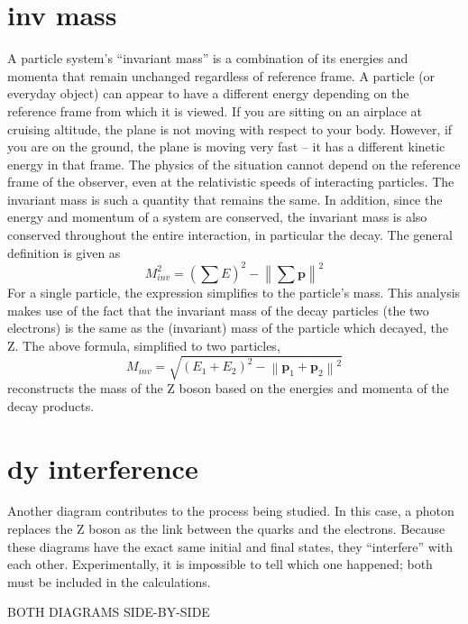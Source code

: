 \section{inv mass}
A particle system's ``invariant mass'' is 
a combination of its energies and momenta that 
remain unchanged regardless of reference frame.  
A particle (or everyday object) can appear to 
have a different energy depending on the reference 
frame from which it is viewed.  
If you are sitting on an airplace at cruising altitude, 
the plane is not moving with respect to your body.  
However, if you are on the ground, the plane is 
moving very fast -- 
it has a different kinetic energy in that frame.  
The physics of the situation cannot depend on 
the reference frame of the observer, 
even at the relativistic speeds of interacting particles.  
The invariant mass is such a quantity that 
remains the same.  
In addition, since the energy and momentum 
of a system are conserved, 
the invariant mass is also conserved 
throughout the entire interaction, 
in particular the decay.  
The general definition is given as 
\[
M_{inv}^2 = \left( \sum E \right)^2 - \left\| \sum \mathbf{p} \right\|^2
\]
For a single particle, the expression simplifies 
to the particle's mass.  
This analysis makes use of the fact that the 
invariant mass of the decay particles 
(the two electrons) 
is the same as the (invariant) mass of the 
particle which decayed, the Z.  
The above formula, simplified to two particles, 
\[
M_{inv} = \sqrt{ \left(E_1 + E_2\right)^2 - \left\|\mathbf{p}_1 + \mathbf{p}_2\right\|^2 }
\]
reconstructs the mass of the Z boson 
based on the energies and momenta 
of the decay products.  


\section{dy interference}
Another diagram contributes to the process being studied. 
In this case, a photon replaces the Z boson 
as the link between the quarks and the electrons.  
Because these diagrams have the exact same 
initial and final states, 
they ``interfere'' with each other.  
Experimentally, it is impossible to tell which one happened; 
both must be included in the calculations.  %

BOTH DIAGRAMS SIDE-BY-SIDE


